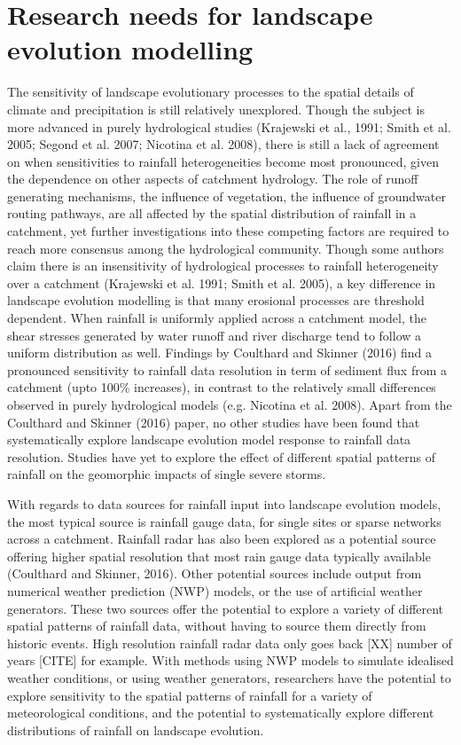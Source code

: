\section{Research needs for landscape evolution modelling}

The sensitivity of landscape evolutionary processes to the spatial details of climate and precipitation is still relatively unexplored. Though the subject is more advanced in purely hydrological studies (Krajewski et al., 1991; Smith et al. 2005; Segond et al. 2007; Nicotina et al. 2008), there is still a lack of agreement on when sensitivities to rainfall heterogeneities become most pronounced, given the dependence on other aspects of catchment hydrology. The role of runoff generating mechanisms, the influence of vegetation, the influence of groundwater routing pathways, are all affected by the spatial distribution of rainfall in a catchment, yet further investigations into these competing factors are required to reach more consensus among the hydrological community. Though some authors claim there is an insensitivity of hydrological processes to rainfall heterogeneity over a catchment (Krajewski et al. 1991; Smith et al. 2005), a key difference in landscape evolution modelling is that many erosional processes are threshold dependent. When rainfall is uniformly applied across a catchment model, the shear stresses generated by water runoff and river discharge tend to follow a uniform distribution as well. Findings by Coulthard and Skinner (2016) find a pronounced sensitivity to rainfall data resolution in term of sediment flux from a catchment (upto 100\% increases), in contrast to the relatively small differences observed in purely hydrological models (e.g. Nicotina et al. 2008). Apart from the Coulthard and Skinner (2016) paper, no other studies have been found that systematically explore landscape evolution model response to rainfall data resolution. Studies have yet to explore the effect of different spatial patterns of rainfall on the geomorphic impacts of single severe storms. 

With regards to data sources for rainfall input into landscape evolution models, the most typical source is rainfall gauge data, for single sites or sparse networks across a catchment. Rainfall radar has also been explored as a potential source offering higher spatial resolution that most rain gauge data typically available (Coulthard and Skinner, 2016). Other potential sources include output from numerical weather prediction (NWP) models, or the use of artificial weather generators. These two sources offer the potential to explore a variety of different spatial patterns of rainfall data, without having to source them directly from historic events. High resolution rainfall radar data only goes back [XX] number of years [CITE] for example. With methods using NWP models to simulate idealised weather conditions, or using weather generators, researchers have the potential to explore sensitivity to the spatial patterns of rainfall for a variety of meteorological conditions, and the potential to systematically explore different distributions of rainfall on landscape evolution. 

